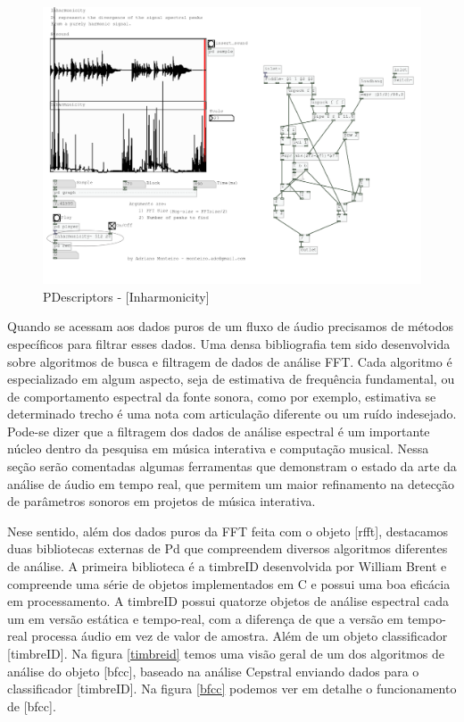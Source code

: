 \documentclass{ppgmus}
\begin{document}
\begin{figure}
\includegraphics[scale=.28]{pdescriptor}
\caption{PDescriptors - [Inharmonicity\texttildelow]}
\label{pdescriptor}
\end{figure} 


Quando se acessam aos dados puros de um fluxo de áudio precisamos de 
métodos específicos para filtrar esses dados. Uma densa bibliografia
tem sido desenvolvida sobre algoritmos de busca e filtragem de dados de
análise FFT. Cada algoritmo é especializado em algum aspecto, seja de
estimativa de frequência fundamental, ou de comportamento espectral da fonte sonora,
como por exemplo, estimativa se determinado trecho é uma nota com articulação diferente
ou um ruído indesejado.
Pode-se dizer que a filtragem dos dados de análise espectral é um importante
núcleo dentro da pesquisa em música interativa e computação musical. Nessa seção
serão comentadas algumas ferramentas que demonstram o estado da arte da análise de 
áudio em tempo real, que permitem um maior refinamento na detecção de parâmetros
sonoros em projetos de música interativa.

Nese sentido, além dos dados puros da FFT feita com o objeto [rfft\texttildelow],
destacamos duas bibliotecas externas de Pd que compreendem diversos algoritmos
diferentes de análise. A primeira biblioteca é a 
timbreID \cite{brentcepstral} desenvolvida por William Brent e compreende uma série de objetos
implementados em C e possui uma boa eficácia em processamento. A timbreID possui 
quatorze objetos de análise espectral cada um em versão estática e tempo-real, com a diferença
de que a versão em tempo-real processa áudio em vez de valor de amostra. Além
de um objeto classificador [timbreID]. Na figura \ref{timbreid} temos
uma visão geral de um dos algoritmos de análise do objeto  [bfcc\texttildelow], baseado na 
análise Cepstral enviando dados para o classificador [timbreID]. Na figura \ref{bfcc} podemos
ver em detalhe o funcionamento de [bfcc\texttildelow].
\end{document}

